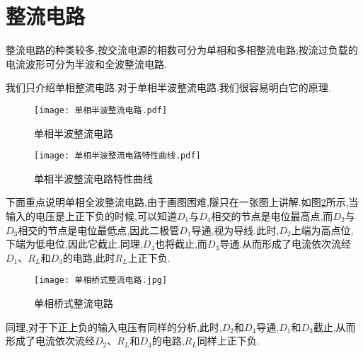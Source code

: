 \section{\K 整流电路}

\Par 整流电路的种类较多,按交流电源的相数可分为单相和多相整流电路;按流过负载的电流波形可分为半波和全波整流电路.

\Par 我们只介绍单相整流电路.对于单相半波整流电路,我们很容易明白它的原理.
\begin{figure}[htbp]
	\centering
	\begin{minipage}[b]{0.48\textwidth}
        \centering
        \texttt{[image: 单相半波整流电路.pdf]}
        \caption{单相半波整流电路}
        \label{fig:单相半波整流电路}
    \end{minipage}
    \begin{minipage}[b]{0.48\textwidth}
        \centering
        \texttt{[image: 单相半波整流电路特性曲线.pdf]}
        \caption{单相半波整流电路特性曲线}
        \label{fig:单相半波整流电路特性曲线}
    \end{minipage}
\end{figure}

\Par 下面重点说明单相全波整流电路,由于画图困难,隧只在一张图上讲解.如图\ref{fig:单相桥式整流电路}所示,当输入的电压是上正下负的时候,可以知道$D_1$与$D_4$相交的节点是电位最高点,而$D_2$与$D_3$相交的节点是电位最低点,因此二极管$D_1$导通,视为导线.此时,$D_2$上端为高点位,下端为低电位,因此它截止.同理,$D_4$也将截止,而$D_3$导通.从而形成了电流依次流经$D_1$、$R_L$和$D_3$的电路,此时$R_L$上正下负.

\begin{figure}[htbp]
	\centering
	\texttt{[image: 单相桥式整流电路.jpg]}
	\caption{单相桥式整流电路}
	\label{fig:单相桥式整流电路}
\end{figure}

\Par 同理,对于下正上负的输入电压有同样的分析,此时,$D_2$和$D_4$导通,$D_1$和$D_3$截止,从而形成了电流依次流经$D_2$、$R_L$和$D_4$的电路,$R_L$同样上正下负.

